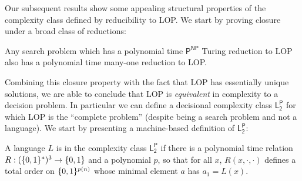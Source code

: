 Our subsequent results show some appealing structural properties of the complexity class defined by reducibility to {\sc LOP}. We start by proving closure under a broad class of reductions:
\begin{theorem}\label{thm:l2p-closure-intro}
Any search problem which has a polynomial time $\mathsf{P^{NP}}$ Turing reduction to {\sc LOP} also has a polynomial time many-one reduction to {\sc LOP}.
\end{theorem}
Combining this closure property with the fact that {\sc LOP} has essentially unique solutions, we are able to conclude that {\sc LOP} is \emph{equivalent} in complexity to a decision problem. In particular we can define a decisional complexity class $\mathsf{L_2^P}$ for which {\sc LOP} is the ``complete problem'' (despite being a search problem and not a language). We start by presenting a machine-based definition of $\mathsf{L_2^P}$:
\begin{definition}\label{def:l2p}
A language $L$ is in the complexity class $\mathsf{L_2^P}$ if there is a polynomial time relation $R: (\{0,1\}^*)^3 \to \{0,1\}$ and a polynomial $p$, so that for all $x$, $R(x, \cdot, \cdot)$ defines a total order on $\{0,1\}^{p(n)}$ whose minimal element $a$ has $a_1 = L(x)$. 
\end{definition}

